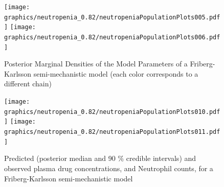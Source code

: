 \documentclass[10pt, reqno, oneside]{amsbook}
\numberwithin{equation}{chapter}
\numberwithin{figure}{chapter}
\numberwithin{table}{chapter}
\theoremstyle{remark}
\begin{document}
\begin{figure}[htbp]
\texttt{[image: graphics/neutropenia\_0.82/neutropeniaPopulationPlots005.pdf]}
\texttt{[image: graphics/neutropenia\_0.82/neutropeniaPopulationPlots006.pdf]}
\caption{{Posterior Marginal Densities of the Model Parameters of a Friberg-Karlsson semi-mechanistic model (each color corresponds to a different chain)}}
\label{FKDens}
\end{figure}

\begin{figure}[htbp]
\texttt{[image: graphics/neutropenia\_0.82/neutropeniaPopulationPlots010.pdf]}
\texttt{[image: graphics/neutropenia\_0.82/neutropeniaPopulationPlots011.pdf]}
\caption{{Predicted (posterior median and 90 \% credible intervals) and observed plasma drug concentrations, and Neutrophil counts, for a Friberg-Karlsson semi-mechanistic model}}
\label{FKPredictions}
\end{figure}

\appendix
\printindex
\backmatter



\end{document}
